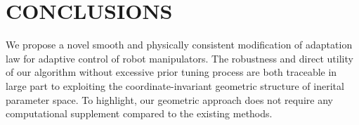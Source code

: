 \documentclass[letterpaper, 10 pt, conference]{ieeeconf}  %
\begin{document}


   


\section{CONCLUSIONS}
We propose a novel smooth and physically consistent modification of adaptation law for adaptive control of robot manipulators. The robustness and direct utility of our algorithm without excessive prior tuning process are both traceable in large part to exploiting the coordinate-invariant geometric structure of inerital parameter space. To highlight, our geometric approach does not require any computational supplement compared to the existing methods.
\end{document}
